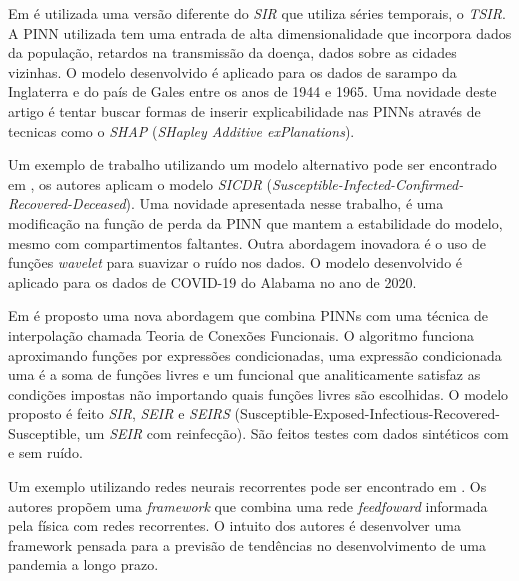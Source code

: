 Em \cite{madden-etal:24-time-series-sir} é utilizada uma versão diferente do 
\textit{SIR} que utiliza séries temporais, o \textit{TSIR}.
A PINN utilizada tem uma entrada de alta dimensionalidade que incorpora dados
da população, retardos na transmissão da doença, dados sobre as cidades vizinhas.
O modelo desenvolvido é aplicado para os dados de sarampo da Inglaterra e do país
de Gales entre os anos de 1944 e 1965. Uma novidade deste artigo é tentar buscar
formas de inserir explicabilidade nas PINNs através de tecnicas como o
\textit{SHAP} (\textit{SHapley Additive exPlanations}).

Um exemplo de trabalho utilizando um modelo alternativo pode ser encontrado em
\cite{hu-etal:22-identificabilidade}, os autores aplicam o modelo \textit{SICDR} 
(\textit{Susceptible-Infected-Confirmed-Recovered-Deceased}).
Uma novidade apresentada nesse trabalho, é uma modificação na função de perda
da PINN que mantem a estabilidade do modelo, mesmo com compartimentos faltantes.
Outra abordagem inovadora é o uso de funções \textit{wavelet} para suavizar o 
ruído nos dados.
O modelo desenvolvido é aplicado para os dados de COVID-19 do Alabama no ano 
de 2020. 

Em \cite{schiassi-etal:21-xtfc} é proposto uma nova abordagem que combina PINNs
com uma técnica de interpolação chamada Teoria de Conexões Funcionais.
O algoritmo funciona aproximando funções por expressões condicionadas, uma expressão
condicionada uma é a soma de funções livres e um funcional que analiticamente satisfaz
as condições impostas não importando quais funções livres são escolhidas.
O modelo proposto é feito \textit{SIR}, \textit{SEIR} e \textit{SEIRS} 
(Susceptible-Exposed-Infectious-Recovered-Susceptible, um \textit{SEIR} com reinfecção). 
São feitos testes com dados sintéticos com e sem ruído.

Um exemplo utilizando redes neurais recorrentes pode ser encontrado 
em \cite{rodriguez-etal:2022-einns}. Os autores propõem uma \textit{framework} 
que combina uma rede \textit{feedfoward} informada pela física com redes recorrentes.
O intuito dos autores é desenvolver uma framework pensada para a previsão de 
tendências no desenvolvimento de uma pandemia a longo prazo.

